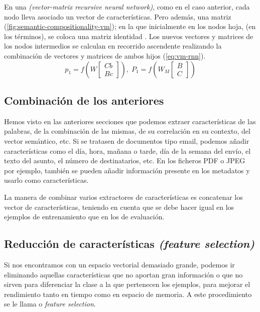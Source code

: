 En una  \emph{(vector-matrix recursive neural network)}, como en el caso anterior, cada nodo lleva asociado un vector de características. Pero además, una matriz (\autoref{fig:semantic-compositionality-vm}); en la que inicialmente en los nodos hoja, (en los términos), se coloca una matriz identidad \citep{Socher2013}. Los nuevos vectores y matrices de los nodos intermedios se calculan en recorrido ascendente realizando la combinación de vectores y matrices de ambos hijos (\autoref{eq:vm-rnn}).
\begin{equation}
p_1 = f\left( W \left[\begin{array}{c}Cb \\Bc\end{array}\right] \right), \;
P_1 = f\left( W_M \left[\begin{array}{c}B \\C\end{array}\right] \right)
\label{eq:vm-rnn}
\end{equation}

\FloatBarrier
\subsection{Combinación de los anteriores}

Hemos visto en las anteriores secciones que podemos extraer características de las palabras, de la combinación de las mismas, de su correlación en su contexto, del vector semántico, etc. Si se tratasen de documentos tipo email, podemos añadir características como el día, hora, mañana o tarde, día de la semana del envío, el texto del asunto, el número de destinatarios, etc. En los ficheros PDF o JPEG por ejemplo, también se pueden añadir información presente en los metadatos y usarlo como características.

La manera de combinar varios extractores de características es concatenar los vector de características, teniendo en cuenta que se debe hacer igual en los ejemplos de entrenamiento que en los de evaluación.

\FloatBarrier
\subsection{Reducción de características \emph{(feature selection)}}
\label{subsec:reduccion-caracteristicas}

Si nos encontramos con un espacio vectorial demasiado grande, podemos ir eliminando aquellas características que no aportan gran información o que no sirven para diferenciar la clase a la que pertenecen los ejemplos, para mejorar el rendimiento tanto en tiempo como en espacio de memoria. A este procedimiento se le llama  o \emph{feature selection}.

